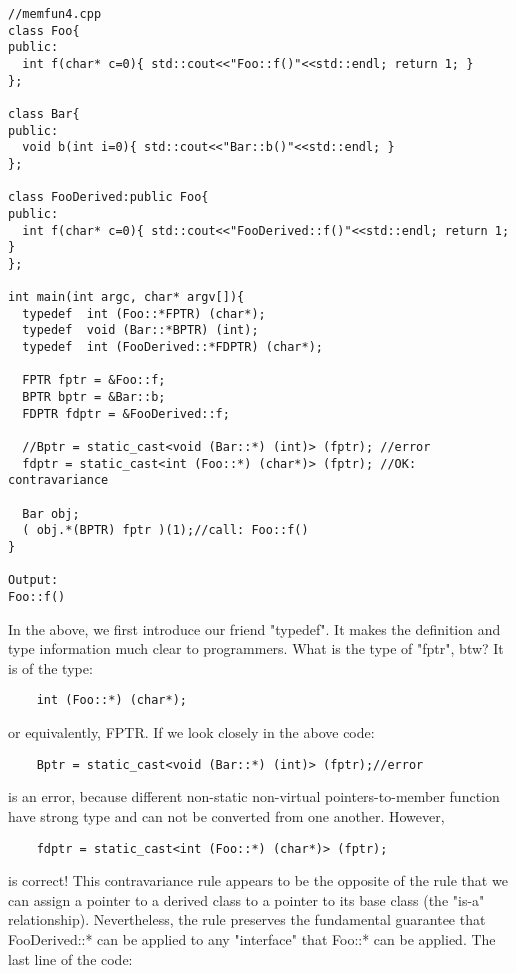 \documentclass{book}
\begin{document}
\begin{lstlisting}
//memfun4.cpp
class Foo{
public:
  int f(char* c=0){ std::cout<<"Foo::f()"<<std::endl; return 1; }
};
 
class Bar{
public:
  void b(int i=0){ std::cout<<"Bar::b()"<<std::endl; }
};
 
class FooDerived:public Foo{
public:
  int f(char* c=0){ std::cout<<"FooDerived::f()"<<std::endl; return 1; }
};
 
int main(int argc, char* argv[]){
  typedef  int (Foo::*FPTR) (char*);
  typedef  void (Bar::*BPTR) (int);
  typedef  int (FooDerived::*FDPTR) (char*);
 
  FPTR fptr = &Foo::f;
  BPTR bptr = &Bar::b;
  FDPTR fdptr = &FooDerived::f;
 
  //Bptr = static_cast<void (Bar::*) (int)> (fptr); //error
  fdptr = static_cast<int (Foo::*) (char*)> (fptr); //OK: contravariance
 
  Bar obj;
  ( obj.*(BPTR) fptr )(1);//call: Foo::f()
}
 
Output:
Foo::f()
\end{lstlisting}

In the above, we first introduce our friend "typedef". It makes the definition and type information much clear to programmers. What is the type of "fptr", btw? It is of the type:

\begin{lstlisting}
    int (Foo::*) (char*);

\end{lstlisting}
or equivalently, FPTR. If we look closely in the above code:

\begin{lstlisting}
    Bptr = static_cast<void (Bar::*) (int)> (fptr);//error

\end{lstlisting}
is an error, because different non-static non-virtual pointers-to-member function have strong type and can not be converted from one another. However,

\begin{lstlisting}
    fdptr = static_cast<int (Foo::*) (char*)> (fptr); 
\end{lstlisting}
is correct! This contravariance rule appears to be the opposite of the rule that we can assign a pointer to a derived class to a pointer to its base class (the "is-a" relationship).
Nevertheless, the rule preserves the fundamental guarantee that FooDerived::* can be applied to any "interface" that Foo::* can be applied. The last line of the code:
\end{document}

